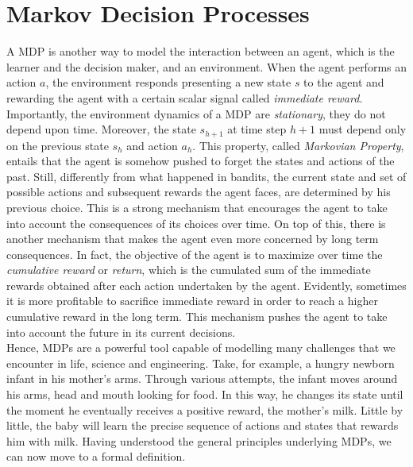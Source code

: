 \section{Markov Decision Processes}
A \gls{MDP} is another way to model the interaction between an agent, which is the learner and the decision maker, and an environment. When the agent performs an action $a$, the environment responds presenting a new state $s$ to the agent and rewarding the agent with a certain scalar signal called \emph{immediate reward}. Importantly, the environment dynamics of a \gls{MDP} are \emph{stationary}, \ie they do not depend upon time. Moreover, the state $s_{h+1}$ at time step $h+1$ must depend only on the previous state $s_{h}$ and action   $a_{h}$. This property, called \emph{Markovian Property}, entails that the agent is somehow pushed to forget the states and actions of the past. Still, differently from what happened in bandits, the current state and set of possible actions and subsequent rewards the agent faces, are determined by his previous choice. This is a strong mechanism that encourages the agent to take into account the consequences of its choices over time. On top of this, there is another mechanism that makes the agent even more concerned by long term consequences. In fact, the objective of the agent is to maximize over time the  \emph{cumulative reward} or \emph{return}, which is the cumulated sum of the immediate rewards obtained after each action undertaken by the agent. Evidently, sometimes it is more profitable to sacrifice immediate reward in order to reach a higher cumulative reward in the long term. This mechanism pushes the agent to take into account the future in its current decisions. \\
Hence, \gls{MDP}s are a powerful tool capable of modelling many challenges that we encounter in life, science and engineering. Take, for example, a hungry newborn infant in his mother's arms. Through various attempts, the infant moves around his arms, head and mouth looking for food. In this way, he changes its state until the moment he eventually receives a positive reward, the mother's milk. Little by little, the baby will learn the precise sequence of actions and states that rewards him with milk. Having understood the general principles underlying \gls{MDP}s, we can now move to a formal definition.

